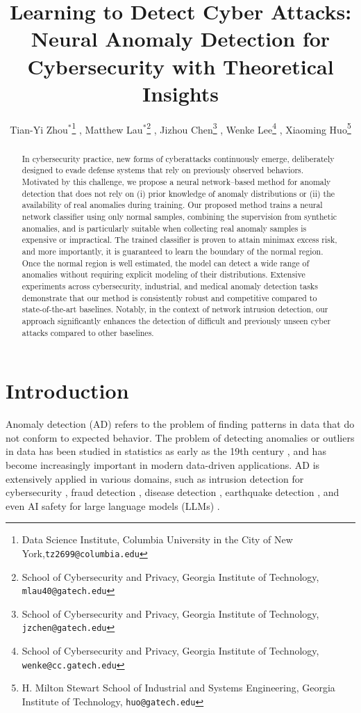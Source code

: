 \documentclass{article}
\title{Learning to Detect Cyber Attacks: Neural Anomaly Detection for Cybersecurity with Theoretical Insights}
\author{Tian-Yi Zhou$^*$\thanks{Data Science Institute, Columbia University in the City of New York,\texttt{tz2699@columbia.edu}} , Matthew Lau$^*$\thanks{School of Cybersecurity and Privacy, Georgia Institute of Technology, \texttt{mlau40@gatech.edu}} , Jizhou Chen\thanks{School of Cybersecurity and Privacy, Georgia Institute of Technology, \texttt{jzchen@gatech.edu}} , Wenke Lee\thanks{School of Cybersecurity and Privacy, Georgia Institute of Technology, \texttt{wenke@cc.gatech.edu}} , Xiaoming Huo\thanks{H. Milton Stewart School of Industrial and Systems Engineering, Georgia Institute of Technology, \texttt{huo@gatech.edu}}}
\date{\vspace{-5ex}}
\begin{document}
\maketitle
\def\thefootnote{*}\def\thefootnote{\arabic{footnote}}
\begin{abstract}
In cybersecurity practice, new forms of cyberattacks continuously emerge, deliberately designed to evade defense systems that rely on previously observed behaviors. Motivated by this challenge, we propose a neural network–based method for anomaly detection that does not rely on (i) prior knowledge of anomaly distributions or (ii) the availability of real anomalies during training. Our proposed  method trains a neural network classifier using only normal samples, combining the supervision from synthetic anomalies, and is particularly suitable when collecting real anomaly samples is expensive or impractical.
The trained classifier is proven to attain minimax excess risk, and more importantly, it is guaranteed to learn the boundary of the normal region. Once the normal region is well estimated, the model can detect a wide range of anomalies without requiring explicit modeling of their distributions.
Extensive experiments across cybersecurity, industrial, and medical anomaly detection tasks demonstrate that our method is consistently robust and competitive compared to state-of-the-art baselines. Notably, in the context of network intrusion detection, our approach significantly enhances the detection of difficult and previously unseen cyber attacks compared to other baselines.
\end{abstract}



\section{Introduction}
Anomaly detection (AD) refers to the problem of finding patterns in data that do not conform to expected behavior.  
 The problem of detecting anomalies or outliers in data has been studied in statistics as early as the 19th century \citep{edgeworth1887xli}, and has become increasingly important in modern data-driven applications.
AD is extensively applied in various domains, such as intrusion detection for cybersecurity \citep{ambusaidi2016building, li2017intrusion, alhajjar2021adversarial}, fraud detection \citep{dorronsoro1997neural, zheng2019one}, disease detection \citep{iakovidis2018detecting, lu2018anomaly}, earthquake detection \citep{perol2018convolutional, seo2024unsupervised}, and even AI safety for large language models (LLMs) \citep{zhu2024llms,zhang2024logicode}.
\end{document}
